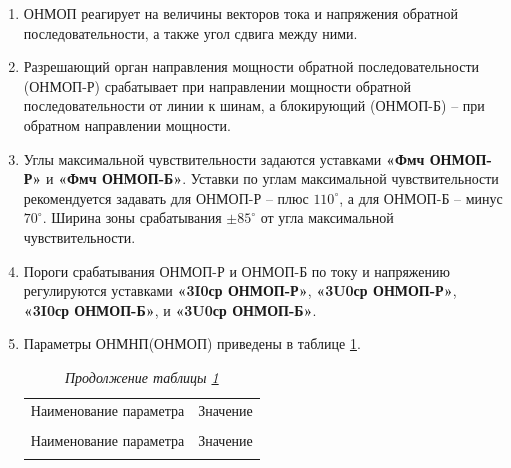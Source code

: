 \begin{enumerate}[label=\arabic{section}.\arabic{subsection}.\arabic{enumi}, labelsep=4pt, leftmargin=0pt, itemindent=57pt, itemsep=0pt, parsep=5pt]
\begin{enumerate}[label=\arabic{section}.\arabic{subsection}.\arabic{enumi}.\arabic*, labelsep=4pt, leftmargin=0em, itemindent=65pt, parsep=0pt]
\item
ОНМОП реагирует на величины векторов тока и напряжения обратной последовательности, а также угол сдвига между ними.

\item
Разрешающий орган направления мощности обратной последовательности (ОНМОП-Р) срабатывает при направлении мощности обратной последовательности от линии к шинам, а блокирующий (ОНМОП-Б) -- при обратном направлении мощности. 

\item
Углы максимальной чувствительности задаются уставками \textbf{«Фмч ОНМОП-Р»} и \textbf{«Фмч ОНМОП-Б»}. Уставки по углам максимальной чувствительности рекомендуется задавать для ОНМОП-Р -- плюс $110^\circ$, а для ОНМОП-Б -- минус $70^\circ$. Ширина зоны срабатывания $\pm 85^\circ$ от угла максимальной чувствительности.

\item
Пороги срабатывания ОНМОП-Р и ОНМОП-Б по току и напряжению регулируются уставками \textbf{«3I0ср ОНМОП-Р»}, \textbf{«3U0ср ОНМОП-Р»}, \textbf{«3I0ср ОНМОП-Б»}, и \textbf{«3U0ср ОНМОП-Б»}.

\item
Параметры ОНМНП(ОНМОП) приведены в таблице \ref{desc_tnznp:tbl2}.

\small
\setlength{\extrarowheight}{0.05cm} %
\begin{longtable}
{|>{\centering\arraybackslash}m{15.2cm}|>{\centering\arraybackslash}m{1.7cm}|}
\caption{Параметры ОНМНП(ОНМОП)\hfill\vspace{-0.5\baselineskip}}\label{desc_tnznp:tbl2}\\ 
\hhline{|-|-|}
\rowcolor{gray!30}
Наименование параметра & Значение  \\ 
\hhline{|-|-|}
\endfirsthead

\caption*{\hspace{3pt}\emph{Продолжение таблицы \ref{desc_tnznp:tbl2}\hfill\vspace{-0.5\baselineskip}}} \\ %
\hhline{|-|-|}
\rowcolor{gray!30}
Наименование параметра & Значение  \\ 
\hhline{|-|-|}
\endhead
\hhline{|-|-|}

\endfoot
\endlastfoot


\end{longtable}
\end{enumerate}
\end{enumerate}
